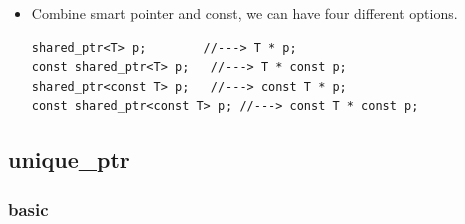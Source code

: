 \documentclass[a4paper,11pt,twoside]{book}
\begin{document}
\begin{itemize}
\item Combine smart pointer and const, we can have four different options.
\begin{lstlisting}[numbers = none]
shared_ptr<T> p;        //---> T * p;
const shared_ptr<T> p;   //---> T * const p;
shared_ptr<const T> p;   //---> const T * p;
const shared_ptr<const T> p; //---> const T * const p;
\end{lstlisting}

\end{itemize}

\subsection{unique\_ptr}

\subsubsection{basic}
\end{document}
